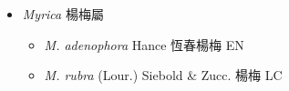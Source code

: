 
  \begin{itemize}
 \item[] \textit{Myrica} 楊梅屬
                                
  \begin{itemize}
        \item[] \textit{M. adenophora} Hance  恆春楊梅   EN
        \item[] \textit{M. rubra} (Lour.) Siebold \& Zucc.  楊梅   LC
  \end{itemize}
  \end{itemize}
